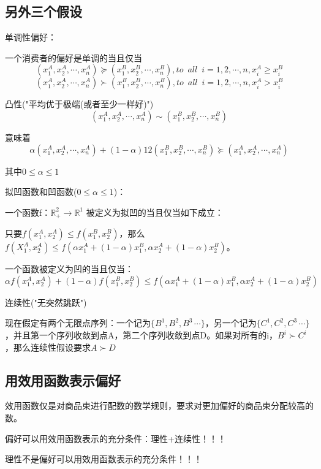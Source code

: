 \documentclass{article}
\begin{document}
\subsection{另外三个假设}
单调性偏好：

一个消费者的偏好是单调的当且仅当
\[
(x_1^A,x_2^A,\cdots,x_n^A)\succeq(x_1^B,x_2^B,\cdots,x_n^B), to\enspace all\enspace i=1,2,\cdots,n,x_i^A\ge x_i^B
\]
\[
(x_1^A,x_2^A,\cdots,x_n^A)\succ(x_1^B,x_2^B,\cdots,x_n^B), to\enspace all\enspace i=1,2,\cdots,n,x_i^A>x_i^B
\]

\hspace*{\fill}

凸性("平均优于极端(或者至少一样好)")
\[
(x_1^A,x_2^A,\cdots,x_n^A)\sim(x_1^B,x_2^B,\cdots,x_n^B)
\]

意味着
\[
\alpha(x_1^A,x_2^A,\cdots,x_n^A)+(1-\alpha){1}{2}(x_1^B,x_2^B,\cdots,x_n^B)\succeq(x_1^A,x_2^A,\cdots,x_n^A)
\]

其中$ 0\le\alpha\le 1 $

\hspace*{\fill}

拟凹函数和凹函数($ 0\le\alpha\le1 $)：

一个函数f：$ \mathbb{R}^2_+\rightarrow\mathbb{R}^1 $ 被定义为拟凹的当且仅当如下成立：

只要$ f(x^A_1,x^A_2)\le f(x^B_1,x^B_2) $，那么$ f(X^A_1,x^A_2)\le f(\alpha x^A_1+(1-\alpha)x^B_1,\alpha x^A_2+(1-\alpha)x^B_2) $。

一个函数被定义为凹的当且仅当：
\[
\alpha f(x^A_1,x^A_2)+(1-\alpha)f(x^B_1,x^B_2)\le f(\alpha x^A_1+(1-\alpha)x^B_1,\alpha x^A_2+(1-\alpha)x^B_2)
\] 

\hspace*{\fill}

连续性("无突然跳跃")

现在假定有两个无限点序列：一个记为$ \{B^1,B^2,B^3\,\cdots\} $，另一个记为$ \{C^1,C^2,C^3\,\cdots\} $，并且第一个序列收敛到点A，第二个序列收敛到点D。如果对所有的i，$ B^i\succ C^i $，那么连续性假设要求$ A\succ D $

\subsection{用效用函数表示偏好}
效用函数仅是对商品束进行配数的数学规则，要求对更加偏好的商品束分配较高的数。

偏好可以用效用函数表示的充分条件：理性+连续性！！！

理性不是偏好可以用效用函数表示的充分条件！！！

\hspace*{\fill}
\end{document}
